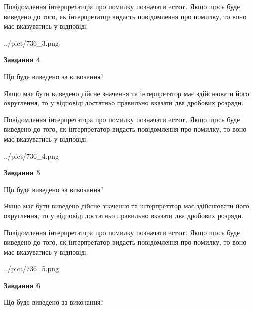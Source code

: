 \documentclass[12pt, ukrainian]{article}
\begin{document}
{\begin {Large}
Повідомлення інтерпретатора про помилку позначати \textbf{error}.
Якщо щось буде виведено до того, як інтерпретатор видасть повідомлення про помилку, 
то воно має вказуватись у відповіді. \par

\begin{center}
	{../pict/736_3.png}
\end{center}
\newpage

{\begin {center}\textbf{Завдання 4}\end {center}}\par
Що буде виведено за виконання? \par

Якщо має бути виведено дійсне значення та інтерпретатор має здійснювати його округлення, 
то у відповіді достатньо правильно вказати два дробових розряди.

Повідомлення інтерпретатора про помилку позначати \textbf{error}.
Якщо щось буде виведено до того, як інтерпретатор видасть повідомлення про помилку, 
то воно має вказуватись у відповіді. \par

\begin{center}
	{../pict/736_4.png}
\end{center}
\newpage

{\begin {center}\textbf{Завдання 5}\end {center}}\par
Що буде виведено за виконання? \par

Якщо має бути виведено дійсне значення та інтерпретатор має здійснювати його округлення, 
то у відповіді достатньо правильно вказати два дробових розряди.

Повідомлення інтерпретатора про помилку позначати \textbf{error}.
Якщо щось буде виведено до того, як інтерпретатор видасть повідомлення про помилку, 
то воно має вказуватись у відповіді. \par

\begin{center}
	{../pict/736_5.png}
\end{center}
\newpage

{\begin {center}\textbf{Завдання 6}\end {center}}\par
Що буде виведено за виконання? \par


\end{Large}}
\end{document}
